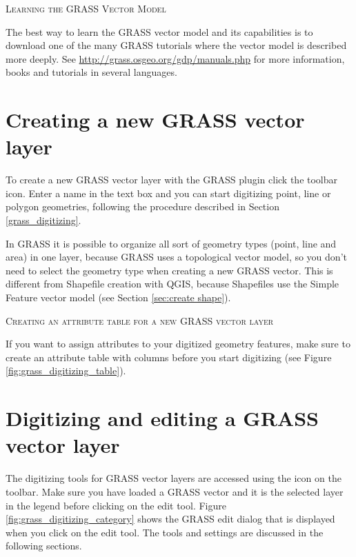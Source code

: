 \begin{Tip}\caption{\textsc{Learning the GRASS Vector Model}}
The best way to learn the GRASS vector model and its capabilities is to
download one of the many GRASS tutorials where the vector model is described
more deeply. See \url{http://grass.osgeo.org/gdp/manuals.php} for more
information, books and tutorials in several languages.
\end{Tip}

\section{Creating a new GRASS vector layer}\label{sec:creating_new_grass_vectors}

To create a new GRASS vector layer with the GRASS plugin click the
 toolbar icon.
Enter a name in the text box and you can start digitizing point, line or
polygon geometries, following the procedure described in Section
\ref{grass_digitizing}.

In GRASS it is possible to organize all sort of geometry types (point, line
and area) in one layer, because GRASS uses a topological vector model, so you
don't need to select the geometry type when creating a new GRASS vector. This
is different from Shapefile creation with QGIS, because Shapefiles use the
Simple Feature vector model (see Section \ref{sec:create shape}).

\begin{Tip}\caption{\textsc{Creating an attribute table for a new GRASS vector layer}}
If you want to assign attributes to your digitized geometry features, make sure to create an attribute table with columns before you start digitizing (see Figure \ref{fig:grass_digitizing_table}).
\end{Tip}

\section{Digitizing and editing a GRASS vector layer}\label{grass_digitizing}

The digitizing tools for GRASS vector layers are accessed using the
 icon on the toolbar. Make
sure you have loaded a GRASS vector and it is the selected layer in the legend
before clicking on the edit tool. Figure \ref{fig:grass_digitizing_category}
shows the GRASS edit dialog that is displayed when you click on the edit tool.
The tools and settings are discussed in the following sections.

